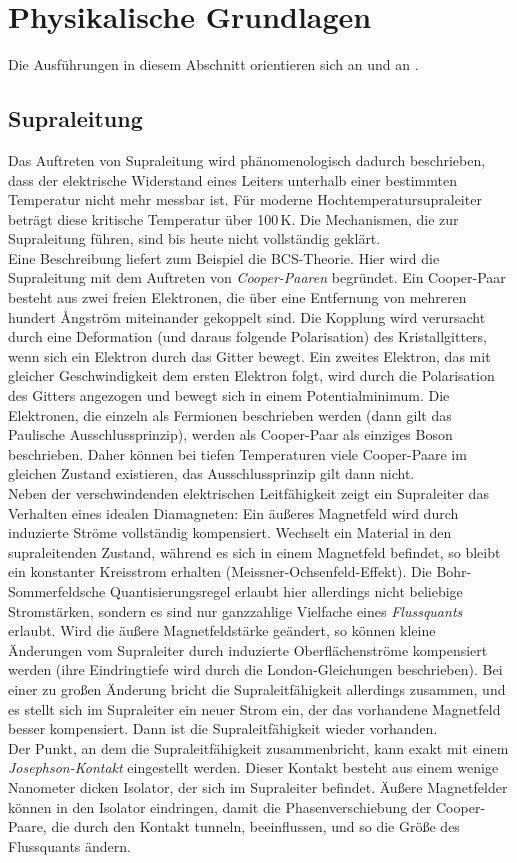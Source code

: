 \section{Physikalische Grundlagen}
Die Ausführungen in diesem Abschnitt orientieren sich an \cite{manual} und an \cite{staatsex}.
\subsection{Supraleitung}
Das Auftreten von Supraleitung wird phänomenologisch dadurch beschrieben,
dass der elektrische Widerstand eines Leiters unterhalb einer bestimmten Temperatur nicht mehr
messbar ist. Für moderne Hochtemperatursupraleiter beträgt diese kritische Temperatur über 100\,K.
Die Mechanismen, die zur Supraleitung führen, sind bis heute nicht vollständig geklärt.\\
Eine Beschreibung liefert zum Beispiel die BCS-Theorie.
Hier wird die Supraleitung mit dem Auftreten von \emph{Cooper-Paaren} begründet.
Ein Cooper-Paar besteht aus zwei freien Elektronen, die über eine Entfernung von mehreren hundert Ångström
miteinander gekoppelt sind.
Die Kopplung wird verursacht durch eine Deformation (und daraus folgende Polarisation) des Kristallgitters,
wenn sich ein Elektron durch das Gitter bewegt. Ein zweites Elektron, das mit gleicher Geschwindigkeit
dem ersten Elektron folgt, wird durch die Polarisation des Gitters angezogen und bewegt sich
in einem Potentialminimum.
Die Elektronen, die einzeln als Fermionen beschrieben werden (dann gilt das Paulische Ausschlussprinzip),
werden als Cooper-Paar als einziges Boson beschrieben.
Daher können bei tiefen Temperaturen viele Cooper-Paare im gleichen Zustand existieren,
das Ausschlussprinzip gilt dann nicht.\\
Neben der verschwindenden elektrischen Leitfähigkeit zeigt ein Supraleiter das Verhalten eines idealen Diamagneten:
Ein äußeres Magnetfeld wird durch induzierte Ströme vollständig kompensiert.
Wechselt ein Material in den supraleitenden Zustand, während es sich in einem Magnetfeld befindet,
so bleibt ein konstanter Kreisstrom erhalten (Meissner-Ochsenfeld-Effekt).
Die Bohr-Sommerfeldsche Quantisierungsregel erlaubt hier allerdings nicht beliebige Stromstärken,
sondern es sind nur ganzzahlige Vielfache eines \emph{Flussquants} erlaubt.
Wird die äußere Magnetfeldstärke geändert,
so können kleine Änderungen vom Supraleiter durch induzierte Oberflächenströme kompensiert werden
(ihre Eindringtiefe wird durch die London-Gleichungen beschrieben).
Bei einer zu großen Änderung bricht die Supraleitfähigkeit allerdings zusammen,
und es stellt sich im Supraleiter ein neuer Strom ein, der das vorhandene Magnetfeld besser kompensiert.
Dann ist die Supraleitfähigkeit wieder vorhanden.\\
Der Punkt, an dem die Supraleitfähigkeit zusammenbricht, kann exakt mit einem \emph{Jo\-seph\-son-Kontakt}
eingestellt werden. Dieser Kontakt besteht aus einem wenige Nanometer dicken Isolator,
der sich im Supraleiter befindet.
Äußere Magnetfelder können in den Isolator eindringen, damit die Phasenverschiebung der Cooper-Paare,
die durch den Kontakt tunneln, beeinflussen, und so die Größe des Flussquants ändern.


